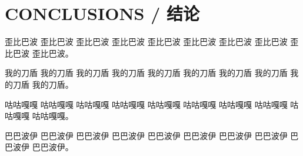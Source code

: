 \section{CONCLUSIONS / 结论}

歪比巴波 歪比巴波 歪比巴波 歪比巴波 歪比巴波 歪比巴波 歪比巴波 歪比巴波 歪比巴波 歪比巴波。

我的刀盾 我的刀盾 我的刀盾 我的刀盾 我的刀盾 我的刀盾 我的刀盾 我的刀盾 我的刀盾 我的刀盾。

咕咕嘎嘎 咕咕嘎嘎 咕咕嘎嘎 咕咕嘎嘎 咕咕嘎嘎 咕咕嘎嘎 咕咕嘎嘎 咕咕嘎嘎 咕咕嘎嘎 咕咕嘎嘎。

巴巴波伊 巴巴波伊 巴巴波伊 巴巴波伊 巴巴波伊 巴巴波伊 巴巴波伊 巴巴波伊 巴巴波伊 巴巴波伊。
